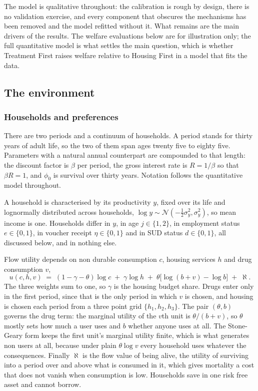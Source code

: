 \documentclass[10pt]{article}
\begin{document}
The model is qualitative throughout: the calibration is rough by design, there
is no validation exercise, and every component that obscures the mechanisms has
been removed and the model refitted without it. What remains are the main
drivers of the results. The welfare evaluations below are for illustration only; the full
quantitative model is what settles the main question, which is whether Treatment
First raises welfare relative to Housing First in a model that fits the data.

\subsection{The environment}\label{sec:env}

\subsubsection{Households and preferences}

There are two periods and a continuum of households. A period stands for
thirty years of adult life, so the two of them span ages twenty five to eighty
five.
Parameters with a natural annual counterpart are compounded to that length: the
discount factor is $\beta$ per period, the gross interest rate is $R=1/\beta$ so
that $\beta R = 1$, and $\phi_0$ is survival over thirty years. Notation follows the
quantitative model throughout.

A household is characterised by its productivity $y$, fixed over its
life and lognormally distributed across households, $\log y \sim
\mathcal{N}(-\tfrac12\sigma_y^2, \sigma_y^2)$, so mean income is one. Households
differ in $y$, in age $j\in\{1,2\}$, in employment status $e\in\{0,1\}$, in
voucher receipt $\eta\in\{0,1\}$ and in SUD status $d\in\{0,1\}$, all
discussed below, and in nothing else.

Flow utility depends on non durable consumption $c$, housing services $h$ and
drug consumption $v$,
\begin{equation}\label{eq:u}
u(c,h,v) \;=\; (1-\gamma-\theta)\log c \;+\; \gamma \log h
\;+\; \theta\big[\log(b+v)-\log b\big] \;+\; \aleph .
\end{equation}
The three weights sum to one, so $\gamma$ is the housing budget share.
Drugs enter only in the first period, since that is the only period in which $v$
is chosen, and housing is chosen each period from a three point grid
$\{h_1,h_2,h_3\}$. The pair $(\theta,b)$ governs the drug term: the marginal
utility of the $v$th unit is $\theta/(b+v)$, so $\theta$ mostly sets how much a
user uses and $b$ whether anyone uses at all. The Stone-Geary form keeps the
first unit's marginal utility finite, which is what generates non users at
all, because under plain $\theta\log v$ every
household uses whatever the consequences. Finally $\aleph$ is the flow value of
being alive, the utility of surviving into a period over and above what is
consumed in it, which gives mortality a cost that does not vanish when
consumption is low. Households save in one risk free asset and cannot borrow.
\end{document}
